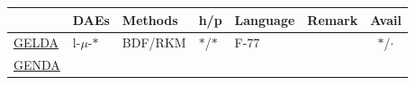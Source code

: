 \documentclass[]{book}
\theoremstyle{definition}
\theoremstyle{definition}
\theoremstyle{definition}
\theoremstyle{definition}
\theoremstyle{remark}
\begin{document}
\begin{longtable}[]{@{}llllllc@{}}
\toprule
\begin{minipage}[b]{0.06\columnwidth}\raggedright
\strut
\end{minipage} & \begin{minipage}[b]{0.06\columnwidth}\raggedright
DAEs\strut
\end{minipage} & \begin{minipage}[b]{0.10\columnwidth}\raggedright
Methods\strut
\end{minipage} & \begin{minipage}[b]{0.05\columnwidth}\raggedright
h/p\strut
\end{minipage} & \begin{minipage}[b]{0.06\columnwidth}\raggedright
Language\strut
\end{minipage} & \begin{minipage}[b]{0.41\columnwidth}\raggedright
Remark\strut
\end{minipage} & \begin{minipage}[b]{0.05\columnwidth}\centering
Avail\strut
\end{minipage}\tabularnewline
\midrule
\endhead
\begin{minipage}[t]{0.06\columnwidth}\raggedright
\href{https://doi.org/10.1137/S1064827595286347}{GELDA}\strut
\end{minipage} & \begin{minipage}[t]{0.06\columnwidth}\raggedright
l-\(\mu\)-\(*\)\strut
\end{minipage} & \begin{minipage}[t]{0.10\columnwidth}\raggedright
BDF/RKM\strut
\end{minipage} & \begin{minipage}[t]{0.05\columnwidth}\raggedright
\(*\)/\(*\)\strut
\end{minipage} & \begin{minipage}[t]{0.06\columnwidth}\raggedright
F-77\strut
\end{minipage} & \begin{minipage}[t]{0.41\columnwidth}\raggedright
\strut
\end{minipage} & \begin{minipage}[t]{0.05\columnwidth}\centering
\(*\)/\(\cdot\)\strut
\end{minipage}\tabularnewline
\begin{minipage}[t]{0.06\columnwidth}\raggedright
\href{https://www3.math.tu-berlin.de/cgi-bin/IfM/show_abstract.cgi?Report-730-2002.rdf.html}{GENDA}\strut

\end{minipage}
\end{longtable}
\end{document}
